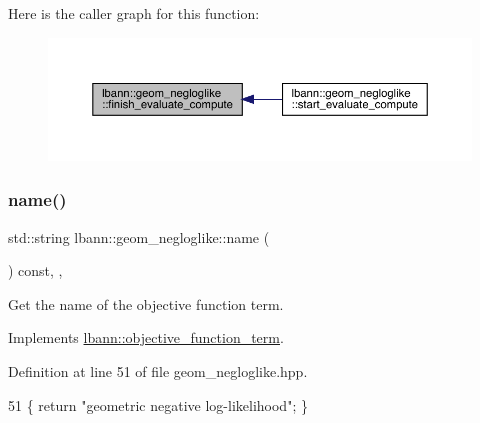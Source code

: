 Here is the caller graph for this function\+:\nopagebreak
\begin{figure}[H]
\begin{center}
\leavevmode
\includegraphics[width=350pt]{classlbann_1_1geom__negloglike_a320ac2f029e0a43640878bc052bf5299_icgraph}
\end{center}
\end{figure}
\mbox{\label{classlbann_1_1geom__negloglike_aabbb379989dba5bc7cb698ebf7bc8861}} 
\subsubsection{\texorpdfstring{name()}{name()}}
{\footnotesize\ttfamily std\+::string lbann\+::geom\+\_\+negloglike\+::name (\begin{DoxyParamCaption}{ }\end{DoxyParamCaption}) const\hspace{0.3cm}{\ttfamily [inline]}, {\ttfamily [override]}, {\ttfamily [virtual]}}

Get the name of the objective function term. 

Implements \hyperlink{classlbann_1_1objective__function__term_a964fbfad3dd0434aa8f32c5fedf1079a}{lbann\+::objective\+\_\+function\+\_\+term}.



Definition at line 51 of file geom\+\_\+negloglike.\+hpp.


\begin{DoxyCode}
51 \{ \textcolor{keywordflow}{return} \textcolor{stringliteral}{"geometric negative log-likelihood"}; \}
\end{DoxyCode}
\mbox{\label{classlbann_1_1geom__negloglike_afc2a0cfef07468bd9ed628b734fbc5da}} 
